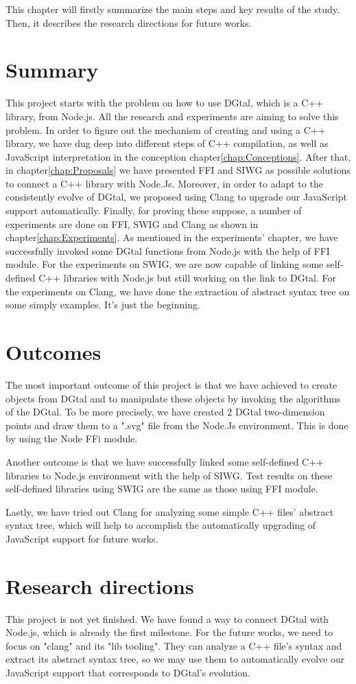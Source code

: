 This chapter will firstly summarize the main steps and key results of the study. Then, it describes the research directions for future works.

\section{Summary}
This project starts with the problem on how to use DGtal, which is a C++ library, from Node.js. All the research and experiments are aiming to solve this problem. In order to figure out the mechanism of creating and using a C++ library, we have dug deep into different steps of C++ compilation, as well as JavaScript interpretation in the conception chapter\ref{chap:Conceptions}. After that, in chapter\ref{chap:Proposals} we have presented FFI and SIWG as possible solutions to connect a C++ library with Node.Js. Moreover, in order to adapt to the consistently evolve of DGtal, we proposed using Clang to upgrade our JavaScript support automatically. Finally, for proving these suppose, a number of experiments are done on FFI, SWIG and Clang as shown in chapter\ref{chap:Experiments}. As mentioned in the experiments' chapter, we have successfully invoked some DGtal functions from Node.js with the help of FFI module. For the experiments on SWIG, we are now capable of linking some self-defined C++ libraries with Node.js but still working on the link to DGtal. For the experiments on Clang, we have done the extraction of abstract syntax tree on some simply examples. It's just the beginning.


\section{Outcomes}
The most important outcome of this project is that we have achieved to create objects from DGtal and to manipulate these objects by invoking the algorithms of the DGtal. To be more precisely, we have created 2 DGtal two-dimension points and draw them to a ".svg" file from the Node.Js environment. This is done by using the Node FFi module.

Another outcome is that we have successfully linked some self-defined C++ libraries to Node.js environment with the help of SIWG. Test results on these self-defined libraries using SWIG are the same as those using FFI module. 

Lastly, we have tried out Clang for analyzing some simple C++ files' abstract syntax tree, which will help to accomplish the automatically upgrading of JavaScript support for future works.

\section{Research directions}

This project is not yet finished. We have found a way to connect DGtal with Node.js, which is already the first milestone. For the future works, we need to focus on "clang" and its "lib tooling". They can analyze a C++ file's syntax and extract its abstract syntax tree, so we may use them to automatically evolve our JavaScript support that corresponds to DGtal's evolution.

